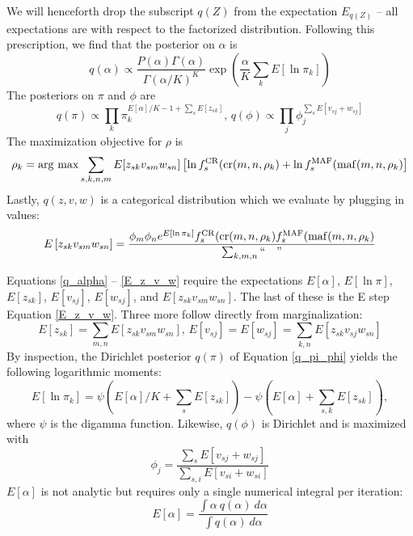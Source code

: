 \documentclass[nofootinbib,amssymb,amsmath]{revtex4}
\begin{document}
We will henceforth drop the subscript $q(Z)$ from the expectation $E_{q(Z)}$ -- all expectations are with respect to the factorized distribution.  Following this prescription, we find that the posterior on $\alpha$ is
%
\begin{equation}
q(\alpha) \propto \frac{P(\alpha) \Gamma(\alpha)}{\Gamma(\alpha/K)^K} \exp \left(  \frac{\alpha}{K} \sum_k E \left[ \ln \pi_k \right] \right)
\label{q_alpha}
\end{equation}
%
The posteriors on $\pi$ and $\phi$ are
%
\begin{equation}
q(\pi) \propto \prod_k \pi_k^{E [\alpha]/K - 1 + \sum_s E \left[ z_{sk} \right]}, \, q(\phi) \propto \prod_j \phi_j^{\sum_s E \left[ v_{sj} + w_{sj} \right]}
\label{q_pi_phi}
\end{equation}
%
The maximization objective for $\rho$ is
%
\begin{equation}
\rho_k = {\rm arg~max}   \sum_{s, k,n,m} E [z_{sk} v_{sm} w_{sn}] \left[ \ln f_s^{\rm CR}({\rm cr}(m,n,\rho_k) + \ln f_s^{\rm MAF}({\rm maf}(m,n,\rho_k) \right]
\label{M_rho}
\end{equation}
%
Lastly, $q(z,v,w)$ is a categorical distribution which we evaluate by plugging in values:
%
\begin{align}
E \left[z_{sk} v_{sm} w_{sn} \right] = \frac{\phi_m \phi_n e^{E \left[\ln \pi_k \right]} f_s^{\rm CR}({\rm cr}(m,n,\rho_k) f_s^{\rm MAF}({\rm maf}(m,n,\rho_k)}{\sum_{k,m,n} `` \quad  "}
\label{E_z_v_w}
\end{align}
%

Equations \ref{q_alpha} -- \ref{E_z_v_w} require the expectations $E[\alpha]$, $E[\ln \pi]$, $E \left[ z_{sk} \right]$, $E[v_{sj}]$, $E[w_{sj}]$, and $E [z_{sk} v_{sm} w_{sn}]$.  The last of these is the E step Equation \ref{E_z_v_w}.  Three more follow directly from marginalization:
%
\begin{equation}
E \left[ z_{sk} \right] = \sum_{m,n} E [z_{sk} v_{sm} w_{sn}], \, E[v_{sj}] = E[w_{sj}] = \sum_{k, n} E [z_{sk} v_{sj} w_{sn}]
\label{marginals}
\end{equation}
%
By inspection, the Dirichlet posterior $q(\pi)$ of Equation \ref{q_pi_phi} yields the following logarithmic moments:
%
\begin{equation}
E [ \ln \pi_k ] = \psi \left( E [\alpha]/K  + \sum_s E \left[ z_{sk} \right] \right) - \psi \left(  E [\alpha]  + \sum_{s,k} E \left[ z_{sk} \right] \right),
\label{E_pi}
\end{equation}
%
where $\psi$ is the digamma function.  Likewise, $q(\phi)$ is Dirichlet and is maximized with
%
\begin{equation}
\phi_j = \frac{ \sum_s E \left[ v_{sj} + w_{sj} \right] }{ \sum_{s,i} E \left[ v_{si} + w_{si} \right] }
\label{M_phi}
\end{equation}
%
$E[\alpha]$ is not analytic but requires only a single numerical integral per iteration:
%
\begin{equation}
E[\alpha] = \frac{ \int \alpha ~ q(\alpha) ~ d \alpha}{ \int q(\alpha) ~ d \alpha}
\label{E_alpha}
\end{equation}
%
\end{document}
